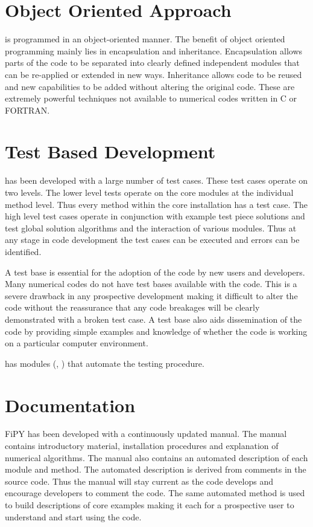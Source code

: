 \section{Object Oriented Approach}

\FiPy{} is programmed in an object-oriented manner. The benefit of object
oriented programming mainly lies in encapsulation and
inheritance. Encapsulation allows parts of the code to be separated
into clearly defined independent modules that can be re-applied or
extended in new ways. Inheritance allows code to be reused and new
capabilities to be added without altering the original code. These are
extremely powerful techniques not available to numerical codes written
in C or FORTRAN.

\section{Test Based Development}

\FiPy{} has been developed with a large number of test cases. These test
cases operate on two levels. The lower level tests operate on the core
modules at the individual method level. Thus every method within the
core installation has a test case. The high level test cases operate
in conjunction with example test piece solutions and test global
solution algorithms and the interaction of various modules. Thus at
any stage in code development the test cases can be executed and
errors can be identified.

A test base is essential for the adoption of the code by new users and
developers. Many numerical codes do not have test bases available with
the code. This is a severe drawback in any prospective development
making it difficult to alter the code without the reassurance that any
code breakages will be clearly demonstrated with a broken test case. A
test base also aids dissemination of the code by providing simple
examples and knowledge of whether the code is working on a particular
computer environment.

\Python{} has modules (\doctest{}, \unittest{}) that automate the testing procedure.

\section{Documentation}

FiPY has been developed with a continuously updated manual. The manual
contains introductory material, installation procedures and
explanation of numerical algorithms. The manual also contains an
automated description of each module and method. The automated
description is derived from comments in the source code. Thus the
manual will stay current as the code develops and encourage developers
to comment the code. The same automated method is used to build
descriptions of core examples making it each for a prospective user to
understand and start using the code.

